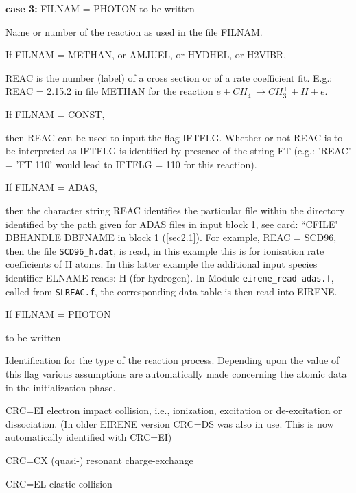 \begin{description}
        \textbf{case 3:} FILNAM = PHOTON to be written 

  \item[REAC] Name or number of the reaction as used in the file FILNAM.

        If FILNAM = METHAN, or AMJUEL, or HYDHEL, or H2VIBR, 

        REAC is the number (label) of a cross section or of a rate coefficient fit.
        E.g.: REAC = 2.15.2 in file METHAN for the reaction $ e + CH_4^+ \rightarrow
          CH_3^+ + H + e $.

        If FILNAM = CONST, 

        then REAC can be used to input the flag IFTFLG.
        Whether or not REAC is to be interpreted as IFTFLG is identified by presence of
        the string FT  (e.g.: 'REAC' = 'FT 110' would lead to IFTFLG = 110 for this
        reaction).

        If FILNAM = ADAS, 

        then the character string REAC identifies the particular file within the
        directory identified by the path given for \ac{ADAS} files in input block 1,
        see card: ``CFILE" DBHANDLE DBFNAME in block 1 (\cref{sec2.1}).
        For example, REAC = SCD96, then the file \lstinline|SCD96_h.dat|, is read, in
        this example this is for ionisation rate coefficients of H atoms.
        In this latter example the additional input species identifier ELNAME reads: H
        (for hydrogen).
        In Module \lstinline|eirene_read-adas.f|, called from \lstinline|SLREAC.f|, the
        corresponding data table is then read into EIRENE.

        If FILNAM = PHOTON 

        to be written 

  \item[CRC] Identification for the type of the reaction process.
        Depending upon the value of this flag various assumptions are automatically
        made concerning the atomic data in the initialization phase.

        \medskip

        CRC=EI electron impact collision, i.e., ionization, excitation or de-excitation
        or dissociation.
        (In older EIRENE version CRC=DS was also in use.
        This is now automatically identified with CRC=EI) 

        CRC=CX (quasi-) resonant charge-exchange 

        CRC=EL elastic collision 


\end{description}
